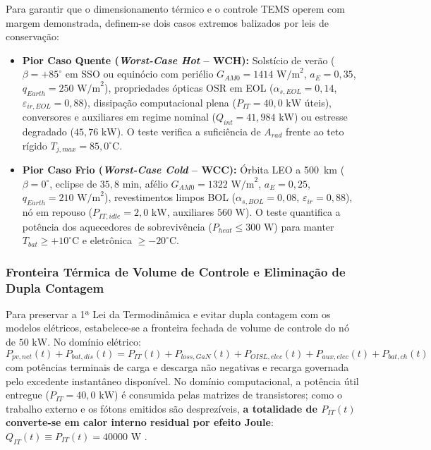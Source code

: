 Para garantir que o dimensionamento térmico e o controle TEMS operem com margem demonstrada, definem-se dois casos extremos balizados por leis de conservação:
\begin{itemize}[leftmargin=*]
    \item \textbf{Pior Caso Quente (\textit{Worst-Case Hot} -- WCH):} Solstício de verão ($\beta = +85^\circ$ em SSO ou equinócio com periélio $G_{AM0} = 1414\text{ W/m}^2$, $a_E = 0{,}35$, $q_{Earth} = 250\text{ W/m}^2$), propriedades ópticas OSR em EOL ($\alpha_{s,EOL}=0{,}14$, $\varepsilon_{ir,EOL}=0{,}88$), dissipação computacional plena ($P_{IT} = 40{,}0\text{ kW}$ úteis), conversores e auxiliares em regime nominal ($Q_{int} = 41{,}984\text{ kW}$) ou estresse degradado ($45{,}76\text{ kW}$). O teste verifica a suficiência de $A_{rad}$ frente ao teto rígido $T_{j,max} = 85{,}0^\circ\text{C}$.
    \item \textbf{Pior Caso Frio (\textit{Worst-Case Cold} -- WCC):} Órbita LEO a 500~km ($\beta = 0^\circ$, eclipse de $35{,}8\text{ min}$, afélio $G_{AM0} = 1322\text{ W/m}^2$, $a_E = 0{,}25$, $q_{Earth} = 210\text{ W/m}^2$), revestimentos limpos BOL ($\alpha_{s,BOL} = 0{,}08$, $\varepsilon_{ir} = 0{,}88$), nó em repouso ($P_{IT,idle} = 2{,}0\text{ kW}$, auxiliares $560\text{ W}$). O teste quantifica a potência dos aquecedores de sobrevivência ($P_{heat} \le 300\text{ W}$) para manter $T_{bat} \ge +10^\circ\text{C}$ e eletrônica $\ge -20^\circ\text{C}$.
\end{itemize}

\subsubsection{Fronteira Térmica de Volume de Controle e Eliminação de Dupla Contagem}

Para preservar a 1ª Lei da Termodinâmica e evitar dupla contagem com os modelos elétricos, estabelece-se a fronteira fechada de volume de controle do nó de $50\text{ kW}$. No domínio elétrico:
\begin{equation}
    P_{pv,net}(t) + P_{bat,dis}(t) = P_{IT}(t) + P_{loss,GaN}(t) + P_{OISL,elec}(t) + P_{aux,elec}(t) + P_{bat,ch}(t)
    \label{eq:fronteira_eletrica}
\end{equation}
com potências terminais de carga e descarga não negativas e recarga governada pelo excedente instantâneo disponível. No domínio computacional, a potência útil entregue ($P_{IT} = 40{,}0\text{ kW}$) é consumida pelas matrizes de transistores; como o trabalho externo e os fótons emitidos são desprezíveis, \textbf{a totalidade de $P_{IT}(t)$ converte-se em calor interno residual por efeito Joule}: $Q_{IT}(t) \equiv P_{IT}(t) = 40000\text{ W}$ .

